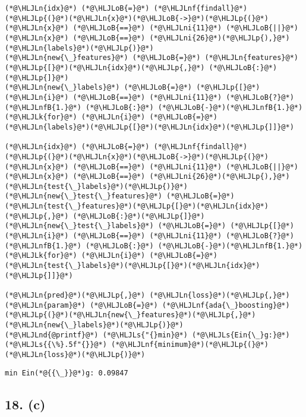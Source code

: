 \documentclass[12pt,a4paper]{article}
\newcommand{\HLJLk}[1]{\textcolor[RGB]{148,91,176}{\textbf{#1}}}
\newcommand{\HLJLn}[1]{#1}
\newcommand{\HLJLnd}[1]{\textcolor[RGB]{214,102,97}{#1}}
\newcommand{\HLJLnf}[1]{\textcolor[RGB]{66,102,213}{#1}}
\newcommand{\HLJLs}[1]{\textcolor[RGB]{201,61,57}{#1}}
\newcommand{\HLJLnfB}[1]{\textcolor[RGB]{59,151,46}{#1}}
\newcommand{\HLJLni}[1]{\textcolor[RGB]{59,151,46}{#1}}
\newcommand{\HLJLoB}[1]{\textcolor[RGB]{102,102,102}{\textbf{#1}}}
\newcommand{\HLJLp}[1]{#1}
\begin{document}
\begin{lstlisting}
(*@\HLJLn{idx}@*) (*@\HLJLoB{=}@*) (*@\HLJLnf{findall}@*)(*@\HLJLp{(}@*)(*@\HLJLn{x}@*)(*@\HLJLoB{->}@*)(*@\HLJLp{(}@*)(*@\HLJLn{x}@*) (*@\HLJLoB{==}@*) (*@\HLJLni{11}@*) (*@\HLJLoB{||}@*) (*@\HLJLn{x}@*) (*@\HLJLoB{==}@*) (*@\HLJLni{26}@*)(*@\HLJLp{),}@*) (*@\HLJLn{labels}@*)(*@\HLJLp{)}@*)
(*@\HLJLn{new{\_}features}@*) (*@\HLJLoB{=}@*) (*@\HLJLn{features}@*)(*@\HLJLp{[}@*)(*@\HLJLn{idx}@*)(*@\HLJLp{,}@*) (*@\HLJLoB{:}@*)(*@\HLJLp{]}@*)
(*@\HLJLn{new{\_}labels}@*) (*@\HLJLoB{=}@*) (*@\HLJLp{[}@*)(*@\HLJLn{i}@*) (*@\HLJLoB{==}@*) (*@\HLJLni{11}@*) (*@\HLJLoB{?}@*) (*@\HLJLnfB{1.}@*) (*@\HLJLoB{:}@*) (*@\HLJLoB{-}@*)(*@\HLJLnfB{1.}@*) (*@\HLJLk{for}@*) (*@\HLJLn{i}@*) (*@\HLJLoB{=}@*) (*@\HLJLn{labels}@*)(*@\HLJLp{[}@*)(*@\HLJLn{idx}@*)(*@\HLJLp{]]}@*)

(*@\HLJLn{idx}@*) (*@\HLJLoB{=}@*) (*@\HLJLnf{findall}@*)(*@\HLJLp{(}@*)(*@\HLJLn{x}@*)(*@\HLJLoB{->}@*)(*@\HLJLp{(}@*)(*@\HLJLn{x}@*) (*@\HLJLoB{==}@*) (*@\HLJLni{11}@*) (*@\HLJLoB{||}@*) (*@\HLJLn{x}@*) (*@\HLJLoB{==}@*) (*@\HLJLni{26}@*)(*@\HLJLp{),}@*) (*@\HLJLn{test{\_}labels}@*)(*@\HLJLp{)}@*)
(*@\HLJLn{new{\_}test{\_}features}@*) (*@\HLJLoB{=}@*) (*@\HLJLn{test{\_}features}@*)(*@\HLJLp{[}@*)(*@\HLJLn{idx}@*)(*@\HLJLp{,}@*) (*@\HLJLoB{:}@*)(*@\HLJLp{]}@*)
(*@\HLJLn{new{\_}test{\_}labels}@*) (*@\HLJLoB{=}@*) (*@\HLJLp{[}@*)(*@\HLJLn{i}@*) (*@\HLJLoB{==}@*) (*@\HLJLni{11}@*) (*@\HLJLoB{?}@*) (*@\HLJLnfB{1.}@*) (*@\HLJLoB{:}@*) (*@\HLJLoB{-}@*)(*@\HLJLnfB{1.}@*) (*@\HLJLk{for}@*) (*@\HLJLn{i}@*) (*@\HLJLoB{=}@*) (*@\HLJLn{test{\_}labels}@*)(*@\HLJLp{[}@*)(*@\HLJLn{idx}@*)(*@\HLJLp{]]}@*)

(*@\HLJLn{pred}@*)(*@\HLJLp{,}@*) (*@\HLJLn{loss}@*)(*@\HLJLp{,}@*) (*@\HLJLn{param}@*) (*@\HLJLoB{=}@*) (*@\HLJLnf{ada{\_}boosting}@*)(*@\HLJLp{(}@*)(*@\HLJLn{new{\_}features}@*)(*@\HLJLp{,}@*) (*@\HLJLn{new{\_}labels}@*)(*@\HLJLp{)}@*)
(*@\HLJLnd{@printf}@*) (*@\HLJLs{"{}min}@*) (*@\HLJLs{Ein{\_}g:}@*) (*@\HLJLs{{\%}.5f"{}}@*) (*@\HLJLnf{minimum}@*)(*@\HLJLp{(}@*)(*@\HLJLn{loss}@*)(*@\HLJLp{)}@*)
\end{lstlisting}

\begin{lstlisting}
min Ein(*@{{\_}}@*)g: 0.09847
\end{lstlisting}


\subsection{18. (c)}
\end{document}

